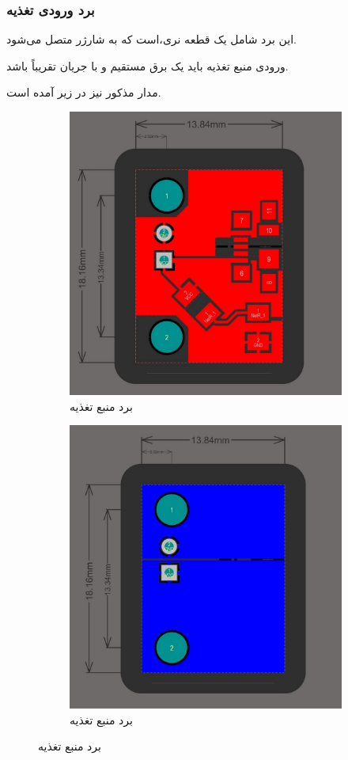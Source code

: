 \documentclass[a4paper,12pt]{report}
\begin{document}
	\pagebreak
	\subsubsection{
		برد ورودی تغذیه
	}\label{subsubsec2:subsec2:sec3:chap2}
		این برد شامل یک قطعه
		نری،‌است که به شارژر متصل می‌شود.

		ورودی منبع تغذیه باید یک برق مستقیم
		و با جریان تقریباً
		باشد.

		مدار مذکور نیز در زیر آمده است.

		\begin{figure}[!h]
			\centering
			\begin{subfigure}{0.3\linewidth}
				\centering
				\includegraphics[width=0.7\linewidth]{resources/altium-power-supplay-top-layer.jpg}
				\caption{
				برد منبع تغذیه
				}
				\label{subfig1:fig1:subsubsec1:subsec2:sec3:chap2}
			\end{subfigure}
			\begin{subfigure}{0.3\linewidth}
				\centering
				\includegraphics[width=0.7\linewidth]{resources/altium-power-supplay-bottom-layer.jpg}
				\caption{
				برد منبع تغذیه
				}
				\label{subfig2:fig1:subsubsec1:subsec2:sec3:chap2}
			\end{subfigure}
			\caption{
			برد منبع تغذیه}
			\label{fig1:subsubsec1:subsec2:sec3:chap2}
		\end{figure}
\end{document}
